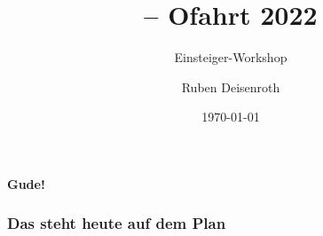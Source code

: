 \documentclass[
    ngerman,
    accentcolor=3b,
    dark_mode,
    fontsize= 12pt,
    a4paper,
    aspectratio=169,
    colorback=true,
    fancy_row_colors,
    leqno,
    fleqn,
    boxarc=3pt,
    fleqn,
    main,
    ]{algoslides}
\subtitle{Einsteiger-Workshop}
\author{Ruben Deisenroth}
\title[\shortworkshoptitle{}]{\workshoptitle{} -- Ofahrt 2022}
\date{\today}
\def\gruesswoerte{Gude!}
\begin{document}

    \maketitle{}

    \begin{frame}[c]
        \centering\huge\textbf{\gruesswoerte{}}
    \end{frame}

    
    \begin{frame}
        \frametitle{Das steht heute auf dem Plan}
        \tableofcontents[subsubsectionstyle=hide]
    \end{frame}



    
\end{document}
